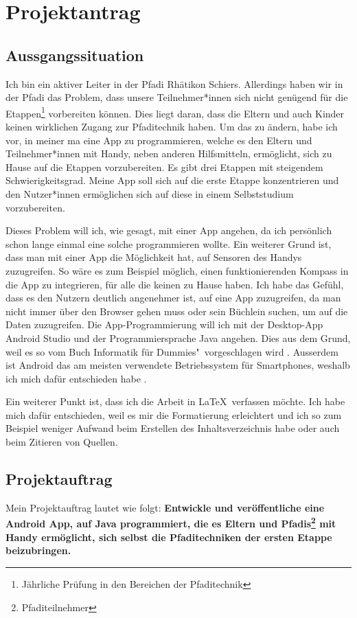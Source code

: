\chapter{Projektantrag}
\section{Aussgangssituation}
Ich bin ein aktiver Leiter in der Pfadi Rhätikon Schiers. Allerdings haben wir in der Pfadi das Problem, dass unsere Teilnehmer*innen sich nicht genügend für die Etappen\footnote{Jährliche Prüfung in den Bereichen der Pfaditechnik} vorbereiten können. Dies liegt daran, dass die Eltern und auch Kinder keinen wirklichen Zugang zur Pfaditechnik haben. Um das zu ändern, habe ich vor, in meiner \gls{ma} eine App zu programmieren, welche es den Eltern und Teilnehmer*innen mit Handy, neben anderen Hilfsmitteln, ermöglicht, sich zu Hause auf die Etappen vorzubereiten. Es gibt drei Etappen mit steigendem Schwierigkeitsgrad. Meine App soll sich auf die erste Etappe konzentrieren und den Nutzer*innen ermöglichen sich auf diese in einem Selbststudium vorzubereiten\cite{anforderungen}. \par
Dieses Problem will ich, wie gesagt, mit einer App angehen, da ich persönlich schon lange einmal eine solche programmieren wollte. Ein weiterer Grund ist, dass man mit einer App die Möglichkeit hat, auf Sensoren des Handys zuzugreifen. So wäre es zum Beispiel möglich, einen funktionierenden Kompass in die App zu integrieren, für alle die keinen zu Hause haben. Ich habe das Gefühl, dass es den Nutzern deutlich angenehmer ist, auf eine App zuzugreifen, da man nicht immer über den Browser gehen muss oder sein Büchlein suchen, um auf die Daten zuzugreifen. Die App-Programmierung will ich mit der Desktop-App Android Studio und der Programmiersprache Java angehen. Dies aus dem Grund, weil es so vom Buch \glqq Informatik für Dummies"\ vorgeschlagen wird \cite{dummies}. Ausserdem ist Android das am meisten verwendete Betriebssystem für Smartphones, weshalb ich mich dafür entschieden habe \cite{statistik_android}.
\par
Ein weiterer Punkt ist, dass ich die Arbeit in \LaTeX \ verfassen möchte. Ich habe mich dafür entschieden, weil es mir die Formatierung erleichtert und ich so zum Beispiel weniger Aufwand beim Erstellen des Inhaltsverzeichnis habe oder auch beim Zitieren von Quellen.

\section{Projektauftrag}
Mein Projektauftrag lautet wie folgt: \textbf{Entwickle und veröffentliche eine Android App, auf Java programmiert, die es Eltern und Pfadis\footnote{Pfaditeilnehmer} mit Handy ermöglicht, sich selbst die Pfaditechniken der ersten Etappe beizubringen.}

